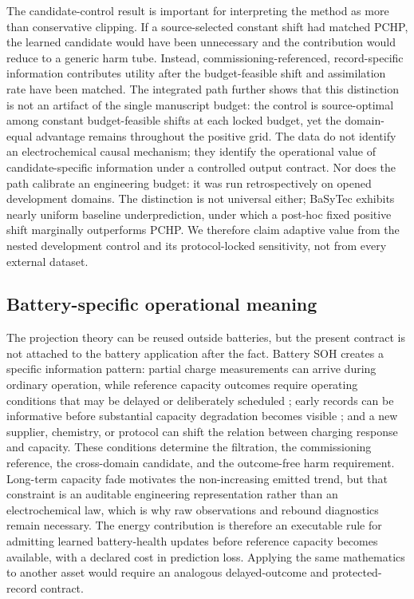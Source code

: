 \documentclass[11pt]{article}
\begin{document}
The candidate-control result is important for interpreting the method as more than conservative clipping. If a source-selected constant shift had matched PCHP, the learned candidate would have been unnecessary and the contribution would reduce to a generic harm tube. Instead, commissioning-referenced, record-specific information contributes utility after the budget-feasible shift and assimilation rate have been matched. The integrated path further shows that this distinction is not an artifact of the single manuscript budget: the control is source-optimal among constant budget-feasible shifts at each locked budget, yet the domain-equal advantage remains throughout the positive grid. The data do not identify an electrochemical causal mechanism; they identify the operational value of candidate-specific information under a controlled output contract. Nor does the path calibrate an engineering budget: it was run retrospectively on opened development domains. The distinction is not universal either; BaSyTec exhibits nearly uniform baseline underprediction, under which a post-hoc fixed positive shift marginally outperforms PCHP. We therefore claim adaptive value from the nested development control and its protocol-locked sensitivity, not from every external dataset.

\subsection{Battery-specific operational meaning}

The projection theory can be reused outside batteries, but the present contract is not attached to the battery application after the fact. Battery SOH creates a specific information pattern: partial charge measurements can arrive during ordinary operation, while reference capacity outcomes require operating conditions that may be delayed or deliberately scheduled \citep{liu2023rapid,zhang2024flexible}; early records can be informative before substantial capacity degradation becomes visible \citep{severson2019cyclelife}; and a new supplier, chemistry, or protocol can shift the relation between charging response and capacity. These conditions determine the filtration, the commissioning reference, the cross-domain candidate, and the outcome-free harm requirement. Long-term capacity fade motivates the non-increasing emitted trend, but that constraint is an auditable engineering representation rather than an electrochemical law, which is why raw observations and rebound diagnostics remain necessary. The energy contribution is therefore an executable rule for admitting learned battery-health updates before reference capacity becomes available, with a declared cost in prediction loss. Applying the same mathematics to another asset would require an analogous delayed-outcome and protected-record contract.
\end{document}
